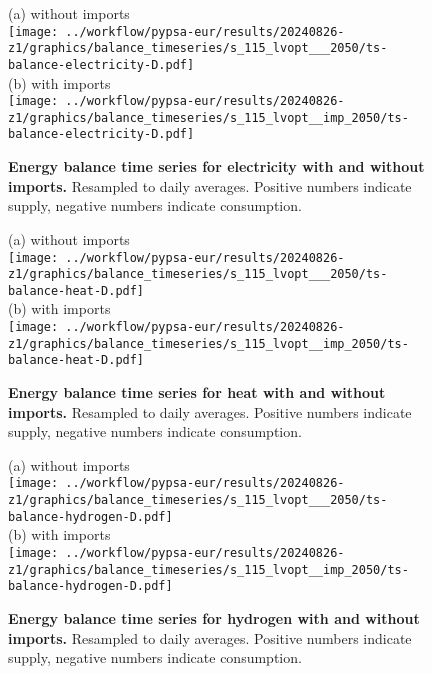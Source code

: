 \begin{figure*}
    \centering
    \footnotesize
    (a) without imports \\
    \texttt{[image: ../workflow/pypsa-eur/results/20240826-z1/graphics/balance\_timeseries/s\_115\_lvopt\_\_\_2050/ts-balance-electricity-D.pdf]} \\
    (b) with imports \\
    \texttt{[image: ../workflow/pypsa-eur/results/20240826-z1/graphics/balance\_timeseries/s\_115\_lvopt\_\_imp\_2050/ts-balance-electricity-D.pdf]}
    \caption{\textbf{Energy balance time series for electricity with and without imports.} Resampled to daily averages. Positive numbers indicate supply, negative numbers indicate consumption.}
    \label{fig:si:balance-elec}
\end{figure*}

\begin{figure*}
    \centering
    \footnotesize
    (a) without imports \\
    \texttt{[image: ../workflow/pypsa-eur/results/20240826-z1/graphics/balance\_timeseries/s\_115\_lvopt\_\_\_2050/ts-balance-heat-D.pdf]} \\
    (b) with imports \\
    \texttt{[image: ../workflow/pypsa-eur/results/20240826-z1/graphics/balance\_timeseries/s\_115\_lvopt\_\_imp\_2050/ts-balance-heat-D.pdf]}
    \caption{\textbf{Energy balance time series for heat with and without imports.} Resampled to daily averages. Positive numbers indicate supply, negative numbers indicate consumption.}
    \label{fig:si:balance-heat}
\end{figure*}

\begin{figure*}
    \centering
    \footnotesize
    (a) without imports \\
    \texttt{[image: ../workflow/pypsa-eur/results/20240826-z1/graphics/balance\_timeseries/s\_115\_lvopt\_\_\_2050/ts-balance-hydrogen-D.pdf]} \\
    (b) with imports \\
    \texttt{[image: ../workflow/pypsa-eur/results/20240826-z1/graphics/balance\_timeseries/s\_115\_lvopt\_\_imp\_2050/ts-balance-hydrogen-D.pdf]}
    \caption{\textbf{Energy balance time series for hydrogen with and without imports.} Resampled to daily averages. Positive numbers indicate supply, negative numbers indicate consumption.}
    \label{fig:si:balance-h2}
\end{figure*}

